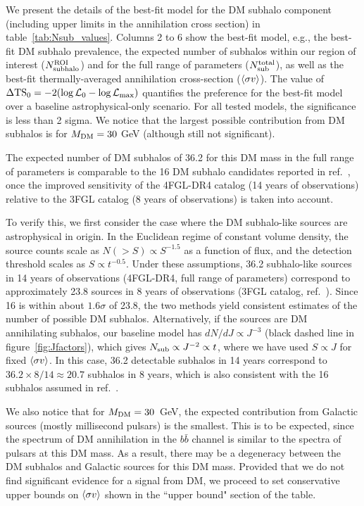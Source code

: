 
We present the details of the best-fit model for the DM subhalo component (including upper limits in the annihilation cross section)
in table~\ref{tab:Nsub_values}.
Columns 2 to 6 show the best-fit model, e.g., the best-fit DM subhalo prevalence, the expected number of subhalos within our region of interest ($N_{\rm subhalo}^{\rm ROI}$) and for the full range of parameters ($N_{\rm sub}^{\rm total}$), as well as the best-fit thermally-averaged annihilation cross-section ($\langle \sigma v \rangle$). The value of $\Delta {\rm TS}_0 = -2(\log\mathcal{L}_0 - \log\mathcal{L}_{\rm max})$ quantifies the preference for the best-fit model over a baseline astrophysical-only scenario. 
For all tested models, the significance is less than 2 sigma.
We notice that the largest possible contribution from DM subhalos is for ${M_\textrm{DM}} = 30$ GeV (although still not significant). 

The expected number of DM subhalos of 36.2  for this DM mass in the full range of parameters  is comparable to the 16 DM subhalo candidates reported in ref.~\cite{2019JCAP...07..020C},
once the improved sensitivity of the 4FGL-DR4 catalog (14 years of observations) relative to the 3FGL catalog (8 years of observations) is taken into account.

To verify this, we first consider the case where the DM subhalo-like sources are astrophysical in origin. In the Euclidean regime of constant volume density, the source counts scale as $N(> S) \propto S^{-1.5}$ as a function of flux, and the detection threshold scales as $S \propto t^{-0.5}$. Under these assumptions, 36.2 subhalo-like sources in 14 years of observations (4FGL-DR4, full range of parameters) correspond to approximately 23.8 sources in 8 years of observations (3FGL catalog, ref.~\cite{2019JCAP...07..020C}).
Since 16 is within about $1.6\sigma$ of 23.8, the two methods yield consistent estimates of the number of possible DM subhalos.
Alternatively, if the sources are DM annihilating subhalos, our baseline model has $dN/dJ \propto J^{-3}$ (black dashed line in figure~\ref{fig:Jfactors}), which gives $N_{\rm sub} \propto J^{-2} \propto t$, where we have used $S \propto J$ for fixed $\langle \sigma v \rangle$.
In this case, 36.2 detectable subhalos in 14 years correspond to $36.2 \times 8 / 14 \approx 20.7$ subhalos in 8 years, which is also consistent with the 16 subhalos assumed in ref.~\cite{2019JCAP...07..020C}.


{We also notice that for ${M_\textrm{DM}} = 30$~GeV},  the expected contribution from Galactic sources (mostly millisecond pulsars) is the smallest.
This is to be expected, since the spectrum of DM annihilation in the $b\bar{b}$ channel is similar to the spectra of pulsars at this DM mass.
As a result, there may be a degeneracy between the DM subhalos and Galactic sources for this DM mass.
Provided that we do not find significant evidence for a signal from DM, we proceed to set conservative upper bounds on $\langle \sigma v \rangle$ shown in the ``upper bound" section of the table.


